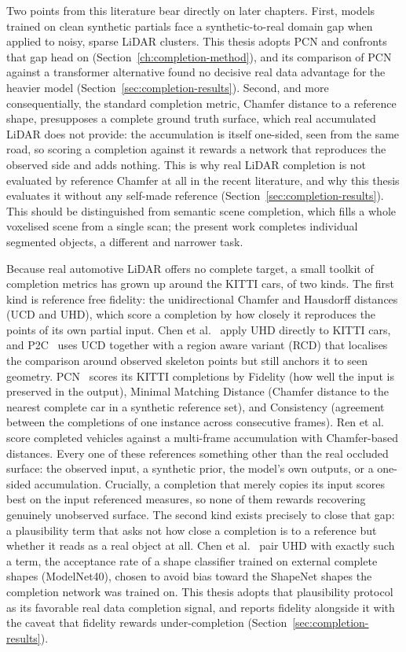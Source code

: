 \documentclass[a4paper,12pt]{report}
\begin{document}
Two points from this literature bear directly on later chapters. First, models trained
on clean synthetic partials face a synthetic-to-real domain gap when applied to noisy,
sparse LiDAR clusters. This thesis adopts PCN and confronts that gap head on
(Section~\ref{ch:completion-method}), and its comparison of PCN against a transformer alternative found no
decisive real data advantage for the heavier model (Section~\ref{sec:completion-results}). Second, and more
consequentially, the standard completion metric, Chamfer distance to a reference
shape, presupposes a complete ground truth surface, which real accumulated LiDAR does
not provide: the accumulation is itself one-sided, seen from the same road, so scoring a
completion against it rewards a network that reproduces the observed side and adds
nothing. This is why real LiDAR completion is not evaluated by reference Chamfer at all
in the recent literature, and why this thesis evaluates it without any self-made
reference (Section~\ref{sec:completion-results}). This should be distinguished from
semantic scene completion, which fills a whole voxelised scene from a single scan;
the present work completes individual segmented objects, a different and narrower task.

Because real automotive LiDAR offers no complete target, a small toolkit of
completion metrics has grown up around the KITTI cars, of two kinds. The first kind is
reference free fidelity: the unidirectional Chamfer and Hausdorff distances
(UCD and UHD), which score a completion by how closely it reproduces the points of its
own partial input. Chen et al.~\cite{chen2020unpaired} apply UHD directly to KITTI cars,
and P2C~\cite{cui2023p2c} uses UCD together with a region aware variant (RCD) that
localises the comparison around observed skeleton points but still anchors it to seen
geometry. PCN~\cite{yuan2019pcnpointcompletionnetwork} scores its KITTI completions by
Fidelity (how well the input is preserved in the output), Minimal Matching
Distance (Chamfer distance to the nearest complete car in a synthetic reference set), and
Consistency (agreement between the completions of one instance across consecutive
frames). Ren et al.~\cite{ren2022selfsupervised} score completed vehicles against a
multi-frame accumulation with Chamfer-based distances. Every one of these references
something other than the real occluded surface: the observed input, a synthetic prior,
the model's own outputs, or a one-sided accumulation. Crucially, a completion that
merely copies its input scores best on the input referenced measures, so none of
them rewards recovering genuinely unobserved surface. The second kind exists precisely to
close that gap: a plausibility term that asks not how close a completion is to a
reference but whether it reads as a real object at all. Chen et
al.~\cite{chen2020unpaired} pair UHD with exactly such a term, the acceptance rate of a
shape classifier trained on external complete shapes (ModelNet40), chosen to avoid bias
toward the ShapeNet shapes the completion network was trained on. This thesis adopts that
plausibility protocol as its favorable real data completion signal, and reports fidelity
alongside it with the caveat that fidelity rewards under-completion
(Section~\ref{sec:completion-results}).
\end{document}
